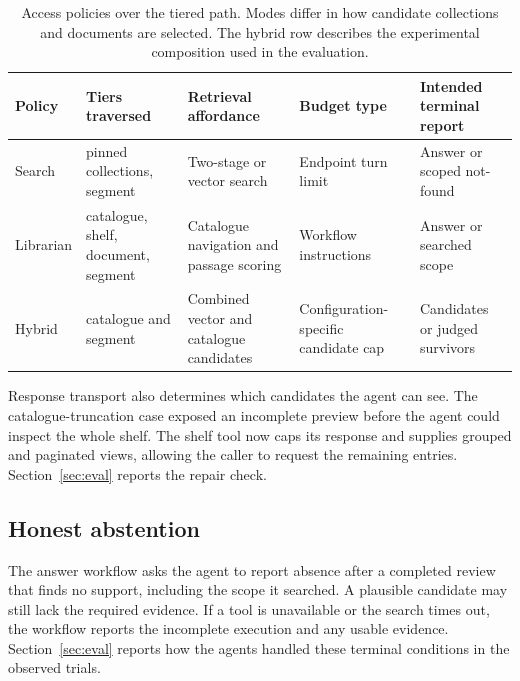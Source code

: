 \begin{table}[t]
\centering
\small
\setlength{\tabcolsep}{5pt}
\caption{Access policies over the tiered path. Modes differ in how candidate collections and documents are selected.
The hybrid row describes the experimental composition used in the evaluation.}
\label{tab:lanes}
\begin{tabular}{@{}>{\raggedright\arraybackslash}p{}>{\raggedright\arraybackslash}p{}>{\raggedright\arraybackslash}p{}>{\raggedright\arraybackslash}p{}>{\raggedright\arraybackslash}p{}@{}}
\toprule
Policy & Tiers traversed & Retrieval affordance & Budget type & Intended terminal report\\
\midrule
Search & pinned collections, segment & Two-stage or vector search & Endpoint turn limit & Answer or scoped not-found\\
Librarian & catalogue, shelf, document, segment & Catalogue navigation and passage scoring & Workflow instructions & Answer or searched scope\\
Hybrid & catalogue and segment & Combined vector and catalogue candidates & Configuration-specific candidate cap & Candidates or judged survivors\\
\bottomrule
\end{tabular}
\end{table}

Response transport also determines which candidates the agent can see.
The catalogue-truncation case exposed an incomplete preview before the agent
could inspect the whole shelf. The shelf tool now caps its response and
supplies grouped and paginated views, allowing the caller to request the
remaining entries. Section~\ref{sec:eval} reports the repair check.

\subsection{Honest abstention}
The answer workflow asks the agent to report absence after a completed
review that finds no support, including the scope it searched. A plausible
candidate may still lack the required evidence. If a tool is unavailable
or the search times out, the workflow reports the incomplete execution
and any usable evidence. Section~\ref{sec:eval} reports how the agents
handled these terminal conditions in the observed trials.
